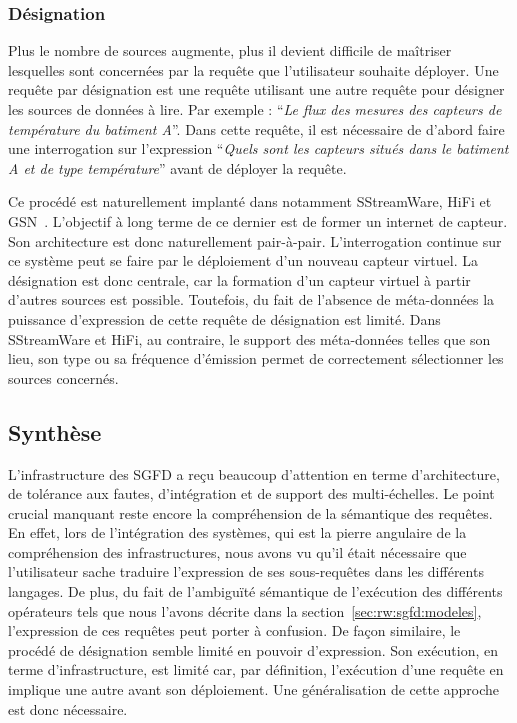 \subsubsection{Désignation}\label{sec:rw:sgfd:infra:designation}
Plus le nombre de sources augmente, plus il devient difficile de maîtriser lesquelles sont concernées par la requête que l'utilisateur souhaite déployer. Une requête par désignation est une requête utilisant une autre requête pour désigner les sources de données à lire. Par exemple : \enquote{\it Le flux des mesures des capteurs de température du batiment A}. Dans cette requête, il est nécessaire de d'abord faire une interrogation sur l'expression \enquote{\it Quels sont les capteurs situés dans le batiment \textit{A} et de type \textit{température}} avant de déployer la requête.

Ce procédé est naturellement implanté dans notamment SStreamWare, HiFi et GSN~\cite{Aberer:gsn}. L’objectif à long terme de ce dernier est de former un internet de capteur. Son architecture est donc naturellement pair-à-pair. L’interrogation continue sur ce système peut se faire par le déploiement d’un nouveau capteur virtuel. La désignation est donc centrale, car la formation d’un capteur virtuel à partir d’autres sources est possible. Toutefois, du fait de l’absence de méta-données la puissance d'expression de cette requête de désignation est limité. Dans SStreamWare et HiFi, au contraire, le support des méta-données telles que son lieu, son type ou sa fréquence d'émission permet de correctement sélectionner les sources concernés.

\subsection{Synthèse}
L'infrastructure des SGFD a reçu beaucoup d'attention en terme d'architecture, de tolérance aux fautes, d'intégration et de support des multi-échelles. Le point crucial manquant reste encore la compréhension de la sémantique des requêtes. En effet, lors de l'intégration des systèmes, qui est la pierre angulaire de la compréhension des infrastructures, nous avons vu qu'il était nécessaire que l'utilisateur sache traduire l'expression de ses sous-requêtes dans les différents langages. De plus, du fait de l'ambiguïté sémantique de l'exécution des différents opérateurs tels que nous l'avons décrite dans la section~\ref{sec:rw:sgfd:modeles}, l'expression de ces requêtes peut porter à confusion. De façon similaire, le procédé de désignation semble limité en pouvoir d'expression. Son exécution, en terme d'infrastructure, est limité car, par définition, l'exécution d'une requête en implique une autre avant son déploiement. Une généralisation de cette approche est donc nécessaire.
